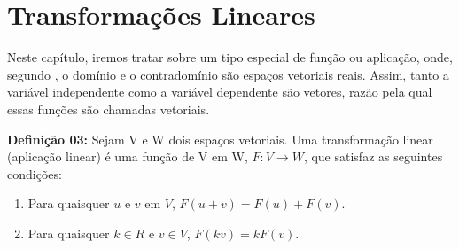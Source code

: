 \chapter{Transformações Lineares}
Neste capítulo, iremos tratar sobre um tipo especial de função ou aplicação, onde, segundo \cite{steinbruch1987}, o domínio e o contradomínio são espaços vetoriais reais. Assim, tanto a variável independente como a variável dependente são vetores, razão pela qual essas funções são chamadas vetoriais.



\noindent\textbf{Definição 03:} Sejam V e W dois espaços vetoriais. Uma transformação linear (aplicação linear) é uma função de V em W, $F:V \rightarrow W$, que satisfaz as seguintes condições:
\begin{enumerate}
	\item Para quaisquer $u$ e $v$ em $V$, $F(u + v) = F(u) + F(v)$.
	\item Para quaisquer $k \in R$ e $v \in V$, $F(kv) = kF(v)$.
\end{enumerate}	